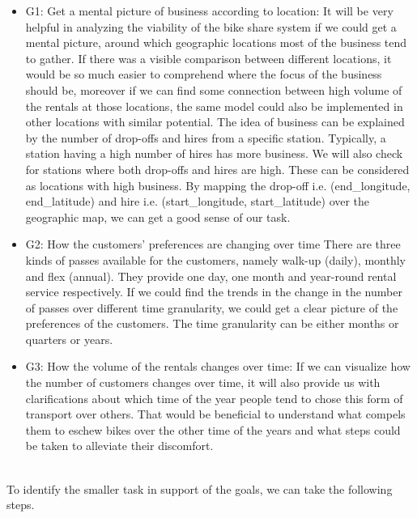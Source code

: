 \begin{itemize}
    \item G1: Get a mental picture of business according to location:
    It will be very helpful in analyzing the viability of the bike share system if we could get a mental picture, around which geographic locations most of the business tend to gather. If there was a visible comparison between different locations, it would be so much easier to comprehend where the focus of the business should be, moreover if we can find some connection between high volume of the rentals at those locations, the same model could also be implemented in other locations with similar potential. The idea of business can be explained by the number of drop-offs and hires from a specific station. Typically, a station having a high number of hires has more business. We will also check for stations where both drop-offs and hires are high. These can be considered as locations with high business. By mapping the drop-off i.e. (end\_longitude, end\_latitude) and hire i.e. (start\_longitude, start\_latitude) over the geographic map, we can get a good sense of our task.

    \item G2:  How the customers’ preferences are changing over time
    There are three kinds of passes available for the customers, namely walk-up (daily), monthly and flex (annual). They provide one day, one month and year-round rental service respectively. If we could find the trends in the change in the number of passes over different time granularity, we could get a clear picture of the preferences of the customers. The time granularity can be either months or quarters or years.
    
    \item G3: How the volume of the rentals changes over time:
    If we can visualize how the number of customers changes over time, it will also provide us with clarifications about which time of the year people tend to chose this form of transport over others. That would be beneficial to understand what compels them to eschew bikes over the other time of the years and what steps could be taken to alleviate their discomfort.
 
\end{itemize}
\\
To identify the smaller task in support of the goals, we can take the following steps.

